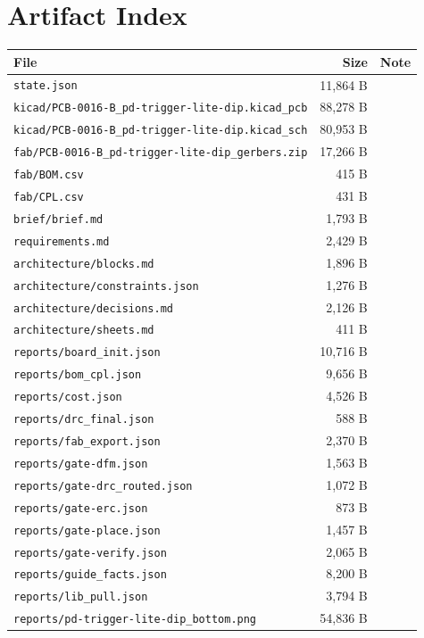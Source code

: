 \documentclass[11pt,a4paper]{article}
\begin{document}
\section{Artifact Index}
{\small
\begin{longtable}{p{9cm}rp{4cm}}
\toprule
\textbf{File} & \textbf{Size} & \textbf{Note} \\
\midrule
\endhead
\texttt{state.json} & 11,864 B &  \\
\texttt{kicad/PCB-0016-B\_pd-trigger-lite-dip.kicad\_pcb} & 88,278 B &  \\
\texttt{kicad/PCB-0016-B\_pd-trigger-lite-dip.kicad\_sch} & 80,953 B &  \\
\texttt{fab/PCB-0016-B\_pd-trigger-lite-dip\_gerbers.zip} & 17,266 B &  \\
\texttt{fab/BOM.csv} & 415 B &  \\
\texttt{fab/CPL.csv} & 431 B &  \\
\texttt{brief/brief.md} & 1,793 B &  \\
\texttt{requirements.md} & 2,429 B &  \\
\texttt{architecture/blocks.md} & 1,896 B &  \\
\texttt{architecture/constraints.json} & 1,276 B &  \\
\texttt{architecture/decisions.md} & 2,126 B &  \\
\texttt{architecture/sheets.md} & 411 B &  \\
\texttt{reports/board\_init.json} & 10,716 B &  \\
\texttt{reports/bom\_cpl.json} & 9,656 B &  \\
\texttt{reports/cost.json} & 4,526 B &  \\
\texttt{reports/drc\_final.json} & 588 B &  \\
\texttt{reports/fab\_export.json} & 2,370 B &  \\
\texttt{reports/gate-dfm.json} & 1,563 B &  \\
\texttt{reports/gate-drc\_routed.json} & 1,072 B &  \\
\texttt{reports/gate-erc.json} & 873 B &  \\
\texttt{reports/gate-place.json} & 1,457 B &  \\
\texttt{reports/gate-verify.json} & 2,065 B &  \\
\texttt{reports/guide\_facts.json} & 8,200 B &  \\
\texttt{reports/lib\_pull.json} & 3,794 B &  \\
\texttt{reports/pd-trigger-lite-dip\_bottom.png} & 54,836 B &  \\

\end{longtable}}
\end{document}
